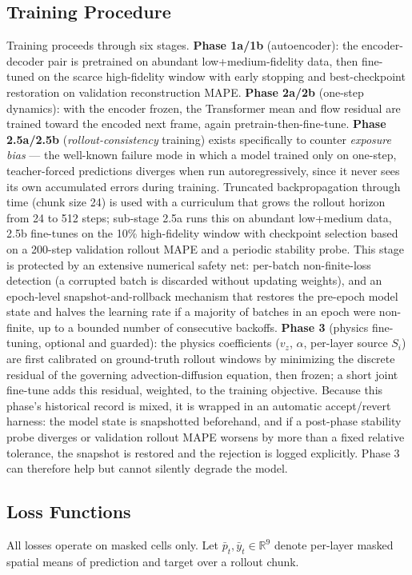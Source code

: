 \documentclass[11pt]{article}
\begin{document}
\subsection{Training Procedure}
Training proceeds through six stages. \textbf{Phase 1a/1b} (autoencoder): the encoder-decoder pair is pretrained on abundant low+medium-fidelity data, then fine-tuned on the scarce high-fidelity window with early stopping and best-checkpoint restoration on validation reconstruction MAPE. \textbf{Phase 2a/2b} (one-step dynamics): with the encoder frozen, the Transformer mean and flow residual are trained toward the encoded next frame, again pretrain-then-fine-tune. \textbf{Phase 2.5a/2.5b} (\emph{rollout-consistency} training) exists specifically to counter \emph{exposure bias} — the well-known failure mode in which a model trained only on one-step, teacher-forced predictions diverges when run autoregressively, since it never sees its own accumulated errors during training. Truncated backpropagation through time (chunk size 24) is used with a curriculum that grows the rollout horizon from 24 to 512 steps; sub-stage 2.5a runs this on abundant low+medium data, 2.5b fine-tunes on the 10\% high-fidelity window with checkpoint selection based on a 200-step validation rollout MAPE and a periodic stability probe. This stage is protected by an extensive numerical safety net: per-batch non-finite-loss detection (a corrupted batch is discarded without updating weights), and an epoch-level snapshot-and-rollback mechanism that restores the pre-epoch model state and halves the learning rate if a majority of batches in an epoch were non-finite, up to a bounded number of consecutive backoffs. \textbf{Phase 3} (physics fine-tuning, optional and guarded): the physics coefficients ($v_z$, $\alpha$, per-layer source $S_i$) are first calibrated on ground-truth rollout windows by minimizing the discrete residual of the governing advection-diffusion equation, then frozen; a short joint fine-tune adds this residual, weighted, to the training objective. Because this phase's historical record is mixed, it is wrapped in an automatic accept/revert harness: the model state is snapshotted beforehand, and if a post-phase stability probe diverges or validation rollout MAPE worsens by more than a fixed relative tolerance, the snapshot is restored and the rejection is logged explicitly. Phase 3 can therefore help but cannot silently degrade the model.

\subsection{Loss Functions}
\label{sec:losses}
All losses operate on masked cells only. Let $\bar p_t,\bar y_t\in\mathbb{R}^9$ denote per-layer masked spatial means of prediction and target over a rollout chunk.
\end{document}
